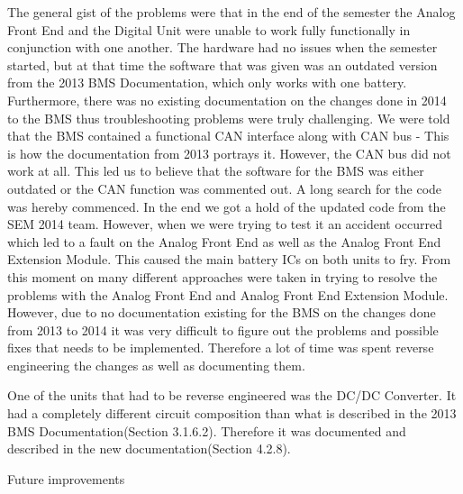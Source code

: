 The general gist of the problems were that in the end of the semester the Analog Front End and the Digital Unit were unable to work fully functionally in conjunction with one another. The hardware had no issues when the semester started, but at that time the software that was given was an outdated version from the 2013 BMS Documentation\cite{BMSDocumentation}, which only works with one battery. Furthermore, there was no existing documentation on the changes done in 2014 to the BMS thus troubleshooting problems were truly challenging.
We were told that the BMS contained a functional CAN interface along with CAN bus - This is how the documentation from 2013 portrays it. However, the CAN bus did not work at all. This led us to believe that the software for the BMS was either outdated or the CAN function was commented out. A long search for the code was hereby commenced. In the end we got a hold of the updated code from the SEM 2014 team. However, when we were trying to test it an accident occurred which led to a fault on the Analog Front End as well as the Analog Front End Extension Module. This caused the main battery ICs on both units to fry.
From this moment on many different approaches were taken in trying to resolve the problems with the Analog Front End and Analog Front End Extension Module. However, due to no documentation existing for the BMS on the changes done from 2013 to 2014 it was very difficult to figure out the problems and possible fixes that needs to be implemented. Therefore a lot of time was spent reverse engineering the changes as well as documenting them. 

One of the units that had to be reverse engineered was the DC/DC Converter. It had a completely different circuit composition than what is described in the 2013 BMS Documentation\cite{BMSDocumentation}(Section 3.1.6.2). Therefore it was documented and described in the new documentation\cite{AU2}(Section 4.2.8). 


Future improvements
